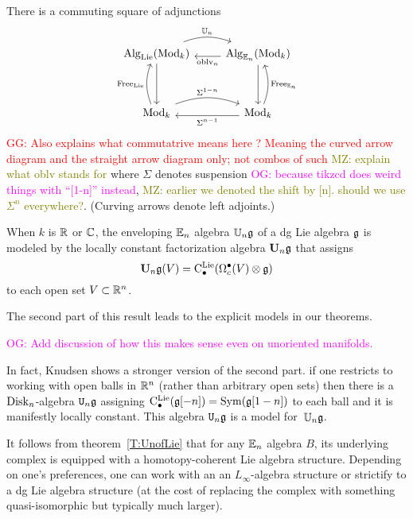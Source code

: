 \documentclass[11pt]{amsart}
\numberwithin{equation}{section}
\def\owen{\textcolor{magenta}{OG: }\textcolor{magenta}}
\def\mahmoud{\textcolor{olive}{MZ: }\textcolor{olive}}
\def\greg{\textcolor{red}{GG: }\textcolor{red}}
\begin{document}
\begin{thm}\label{T:UnofLie}
There is a commuting square of adjunctions
\[
\begin{tikzcd}
\Alg_\Lie(\Mod_k) \arrow[r, bend left=20, shift left=.5ex,"\UU_n"] \arrow[dd] & \Alg_{\EE_n}(\Mod_k) \arrow[l, shift left=.5ex, "\oblv_n"] \arrow[dd]\\
&\\
\Mod_k \arrow[r, bend left=20, shift left=.5ex, "\Sigma^{1-n}"] \arrow[uu, bend left=20, shift left=.5ex, "\Free_\Lie"] & \Mod_k \arrow[l, shift left=.5ex,"\Sigma^{n-1}"] \arrow[uu, bend right=20, shift right=.5ex, "\Free_{\EE_n}"']
\end{tikzcd}
\]
\greg{Also explains what commutatrive means here ? Meaning the curved arrow diagram and the straight arrow diagram only; not combos of such}
\mahmoud{explain what oblv stands for}
where $\Sigma$ denotes suspension \owen{because tikzcd does weird things with ``[1-n]'' instead}, \mahmoud{earlier we denoted the shift by [n]. should we use $\Sigma^n$ everywhere?}.
(Curving arrows denote left adjoints.)

When $k$ is $\mathbb R$ or $\mathbb C$, 
the enveloping $\mathbb E_n$ algebra $\mathbb U_n \mathfrak g$ of a dg Lie algebra $\mathfrak g$ is modeled by the locally constant factorization algebra $\mathbf U_n \mathfrak g$ that assigns
\[
\mathbf U_n \mathfrak g(V) = {\rm C}^{\rm Lie}_\bullet(\Omega^\bullet_c(V) \otimes \mathfrak g)
\]
to each open set $V \subset \mathbb R^n$.
\end{thm}

The second part of this result leads to the explicit models in our theorems.

\owen{Add discussion of how this makes sense even on unoriented manifolds.}

In fact, Knudsen shows a stronger version of the second part.
if one restricts to working with open balls in $\mathbb R^n$ (rather than arbitrary open sets)
then there is a ${\rm Disk}_n$-algebra ${\tt U}_n \mathfrak g$ assigning ${\rm C}^{\rm Lie}_\bullet(\mathfrak g[-n]) = {\rm Sym}(\mathfrak g[1-n])$ to each ball and it is manifestly locally constant.
This algebra ${\tt U}_n \mathfrak g$ is a model for~$\mathbb U_n \mathfrak g$.

\begin{rmk}
It follows from theorem~\ref{T:UnofLie} that for any $\mathbb E_n$ algebra $B$, 
its underlying complex is equipped with a homotopy-coherent Lie algebra structure.
Depending on one's preferences, one can work with an an $L_\infty$-algebra structure or strictify to a dg Lie algebra structure (at the cost of replacing the complex with something quasi-isomorphic but typically much larger).
\end{rmk}
\end{document}
